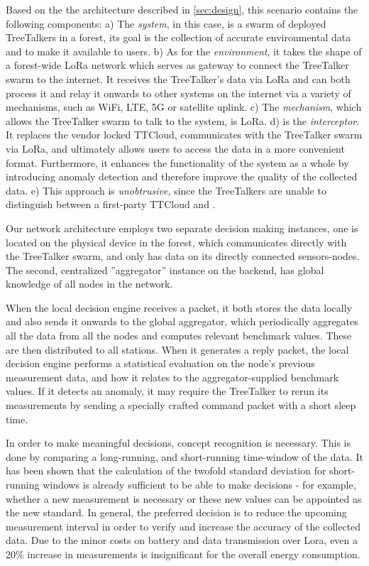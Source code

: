 Based on the the architecture described in \ref{sec:design}, this scenario contains the following components:
a) The \textit{system}, in this case, is a swarm of deployed TreeTalkers in a forest, its goal is the collection of accurate environmental data and to make it available to users.
b) As for the \textit{environment}, it takes the shape of a forest-wide LoRa network which serves as gateway to connect the TreeTalker swarm to the internet.
It receives the TreeTalker's data via LoRa and can both process it and relay it onwards to other systems on the internet via a variety of mechanisms, such as WiFi, LTE, 5G or satellite uplink.
c) The \textit{mechanism}, which allows the TreeTalker swarm to talk to the system, is LoRa.
d) \textit{\ttt} is the \textit{interceptor}.
It replaces the vendor locked TTCloud, communicates with the TreeTalker swarm via LoRa, and ultimately allows users to access the data in a more convenient format.
Furthermore, it enhances the functionality of the system as a whole by introducing anomaly detection and therefore improve the quality of the collected data.
e) This approach is \textit{unobtrusive}, since the TreeTalkers are unable to distinguish between a first-party TTCloud and \ttt.

Our network architecture employs two separate decision making instances, one is located on the physical device in the forest, which communicates directly with the TreeTalker swarm, and only has data on its directly connected sensors-nodes.
The second, centralized ''aggregator'' instance on the backend, has global knowledge of all nodes in the network.

When the local decision engine receives a packet, it both stores the data locally and also sends it onwards to the global aggregator, which periodically aggregates all the data from all the nodes and computes relevant benchmark values. 
These are then distributed to all stations.
When it generates a reply packet, the local decision engine performs a statistical evaluation on the node's previous measurement data, and how it relates to the aggregator-supplied benchmark values.
If it detects an anomaly, it may require the TreeTalker to rerun its measurements by sending a specially crafted command packet with a short sleep time.

In order to make meaningful decisions, concept recognition is necessary.
This is done by comparing a long-running, and short-running time-window of the data.
It has been shown that the calculation of the twofold standard deviation for short-running windows is already sufficient to be able to make decisions - for example, whether a new measurement is necessary or these new values can be appointed as the new standard.
In general, the preferred decision is to reduce the upcoming measurement interval in order to verify and increase the accuracy of the collected data.
Due to the minor costs on battery and data transmission over Lora, even a 20\% increase in measurements is insignificant for the overall energy consumption. 

